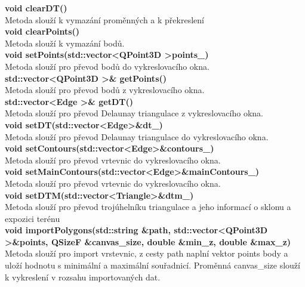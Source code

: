 \documentclass[a4paper, 12pt]{article}
\begin{document}
\textbf{void clearDT()}\\
Metoda slouží k vymazání proměnných a k překreslení
\\

\textbf{void clearPoints()}\\
Metoda slouží k vymazání bodů.
\\

\textbf{void setPoints(std::vector\textless QPoint3D \textgreater points\_)}\\
Metoda slouží pro převod bodů do vykreslovacího okna.\\

\textbf{std::vector\textless QPoint3D \textgreater \& getPoints()}\\
Metoda slouží pro převod bodů z vykreslovacího okna.\\

\textbf{std::vector\textless Edge \textgreater \& getDT()}\\
Metoda slouží pro převod Delaunay triangulace z vykreslovacího okna.\\

\textbf{void setDT(std::vector\textless Edge\textgreater \&dt\_)}\\
Metoda slouží pro převod Delaunay triangulace do vykreslovacího okna.\\

\textbf{void setContours(std::vector\textless Edge\textgreater\&contours\_)}\\
Metoda slouží pro převod vrtevnic do vykreslovacího okna.\\

\textbf{void setMainContours(std::vector\textless Edge\textgreater\&mainContours\_)}\\
Metoda slouží pro převod vrtevnic do vykreslovacího okna.\\

\textbf{void setDTM(std::vector\textless Triangle\textgreater \&dtm\_)}\\
Metoda slouží pro převod trojúhelníku triangulace a jeho informací o sklonu a expozici terénu\\

\textbf{void importPolygons(std::string \&path, std::vector\textless QPoint3D \textgreater \&points,  QSizeF \&canvas\_size, double \&min\_z, double \&max\_z)}\\
Metoda slouží pro import vrstevnic, z cesty path naplní vektor points body a uloží hodnotu s minimální a maximální souřadnicí. Proměnná canvas\_size slouží k vykreslení v rozsahu importovaných dat.\\
\end{document}
